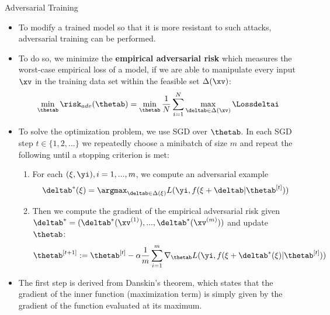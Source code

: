 \begin{vbframe}{Adversarial Training}
    \begin{itemize}
        \item To modify a trained model so that it is more resistant to such attacks, adversarial training can be performed. 
        \lz
          \lz
        \item To do so, we minimize the \textbf{empirical adversarial risk} which measures the worst-case empirical loss of a model, if we are able to manipulate every input $\xv$ in the training data set within the feasible set $\Delta(\xv)$:
        \begin{equation*}
            \min_{\thetab} \risk_{adv}(\thetab) = \min_{\thetab} \frac{1}{N} \sum_{i = 1}^{N} \max_{\deltab \in \Delta(\xv)} \Lossdeltai
        \end{equation*}
          
          \framebreak
      
        \item To solve the optimization problem, we use SGD over $\thetab$. In each SGD step $t \in \{1, 2,...\}$ we repeatedly choose a minibatch of size $m$ and repeat the following until a stopping criterion is met: 
        \begin{enumerate}
            \item For each $(\xi, \yi), i = 1, ..., m$, we compute an adversarial example 
            \begin{equation*}
                \deltab^{*}(\xi) = \argmax_{\deltab \in \Delta(\xi)} L(\yi, f(\xi + \deltab| \thetab^{[t]}))
            \end{equation*}
            \item Then we compute the gradient of the empirical adversarial risk given $\deltab^* = (\deltab^*(\xv^{(1)}), ..., \deltab^*(\xv^{(m)}))$ and update $\thetab$: 
            \begin{equation*}
                \thetab^{[t+1]} := \thetab^{[t]} - \alpha \frac{1}{m} \sum_{i = 1}^{m} \nabla_{\thetab} L(\yi, f(\xi + \deltab^*(\xi)| \thetab^{[t]}))
            \end{equation*}
        \end{enumerate}
        \item The first step is derived from Danskin's theorem, which states that the gradient of the inner function (maximization term) is simply given by the gradient of the function evaluated at its maximum.
    \end{itemize}
\end{vbframe}

